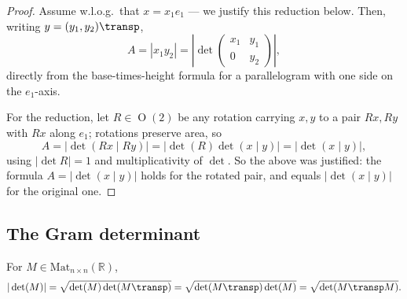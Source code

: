 \begin{proof}
Assume w.l.o.g.\ that $x = x_1e_1$ --- we justify this reduction below. Then, writing
$y = (y_1,y_2)\transp$,
\[A = |x_1y_2| = \left|\det\begin{pmatrix} x_1 & y_1 \\ 0 & y_2 \end{pmatrix}\right|,\]
directly from the base-times-height formula for a parallelogram with one side on the
$e_1$-axis.

\begin{center}
\end{center}

For the reduction, let $R \in \operatorname{O}(2)$ be any rotation carrying $x,y$ to a pair
$Rx,Ry$ with $Rx$ along $e_1$; rotations preserve area, so
\[A = \big|\det(Rx\mid Ry)\big| = \big|\det(R)\det(x\mid y)\big| = \big|\det(x\mid y)\big|,\]
using $|\det R| = 1$ and multiplicativity of $\det$. So the  above was
justified: the formula $A=|\det(x\mid y)|$ holds for the rotated pair, and equals
$|\det(x\mid y)|$ for the original one.
\end{proof}

\subsection{The Gram determinant}
\label{sec:gram_determinant}

\begin{lemma}
\label{lem:gram_determinant_square}
For $M \in \mathrm{Mat}_{n\times n}(\mathbb{R})$,
\[|\det(M)| = \sqrt{\det(M)\det(M\transp)} = \sqrt{\det(M\transp)\det(M)}
  = \sqrt{\det(M\transp M)}.\]
\end{lemma}

